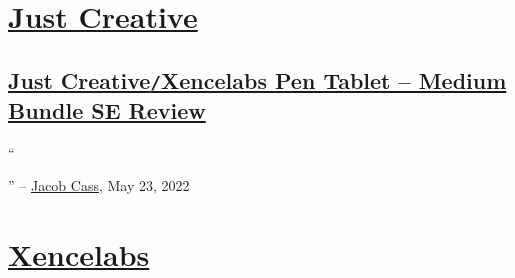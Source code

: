 \documentclass[oneside]{book}
\numberwithin{equation}{section}
\begin{document}

\chapter{\href{https://justcreative.com/}{Just Creative}}

\section{\href{https://justcreative.com/xencelabs-pen-tablet-medium-bundle-se-review/}{Just Creative\texttt{/}Xencelabs Pen Tablet -- Medium Bundle SE Review}}
``

'' -- \href{https://justcreative.com/author/jacob-cass/}{Jacob Cass}, May 23, 2022




\chapter{\href{https://www.xencelabs.com}{Xencelabs}}




\begin{thebibliography}{99}
	\bibitem[]{}
\end{thebibliography}


\printbibliography[heading=bibintoc]
	
\end{document}
